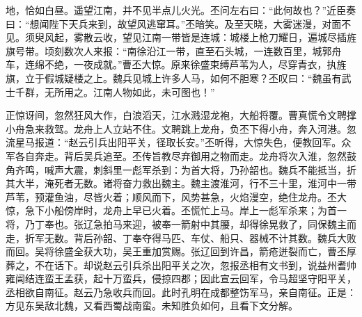 地，恰如白昼。遥望江南，并不见半点儿火光。丕问左右曰：“此何故也？”近臣奏曰：“想闻陛下天兵来到，故望风逃窜耳。”丕暗笑。及至天晓，大雾迷漫，对面不见。须臾风起，雾散云收，望见江南一带皆是连城：城楼上枪刀耀日，遍城尽插旌旗号带。顷刻数次人来报：“南徐沿江一带，直至石头城，一连数百里，城郭舟车，连绵不绝，一夜成就。”曹丕大惊。原来徐盛束缚芦苇为人，尽穿青衣，执旌旗，立于假城疑楼之上。魏兵见城上许多人马，如何不胆寒？丕叹曰：“魏虽有武士千群，无所用之。江南人物如此，未可图也！”

正惊讶间，忽然狂风大作，白浪滔天，江水溅湿龙袍，大船将覆。曹真慌令文聘撑小舟急来救驾。龙舟上人立站不住。文聘跳上龙舟，负丕下得小舟，奔入河港。忽流星马报道：“赵云引兵出阳平关，径取长安。”丕听得，大惊失色，便教回军。众军各自奔走。背后吴兵追至。丕传旨教尽弃御用之物而走。龙舟将次入淮，忽然鼓角齐鸣，喊声大震，刺斜里一彪军杀到：为首大将，乃孙韶也。魏兵不能抵当，折其大半，淹死者无数。诸将奋力救出魏主。魏主渡淮河，行不三十里，淮河中一带芦苇，预灌鱼油，尽皆火着；顺风而下，风势甚急，火焰漫空，绝住龙舟。丕大惊，急下小船傍岸时，龙舟上早已火着。丕慌忙上马。岸上一彪军杀来；为首一将，乃丁奉也。张辽急拍马来迎，被奉一箭射中其腰，却得徐晃救了，同保魏主而走，折军无数。背后孙韶、丁奉夺得马匹、车仗、船只、器械不计其数。魏兵大败而回。吴将徐盛全获大功，吴王重加赏赐。张辽回到许昌，箭疮迸裂而亡，曹丕厚葬之，不在话下。却说赵云引兵杀出阳平关之次，忽报丞相有文书到，说益州耆帅雍闿结连蛮王孟获，起十万蛮兵，侵掠四郡；因此宣云回军，令马超坚守阳平关，丞相欲自南征。赵云乃急收兵而回。此时孔明在成都整饬军马，亲自南征。正是：方见东吴敌北魏，又看西蜀战南蛮。未知胜负如何，且看下文分解。